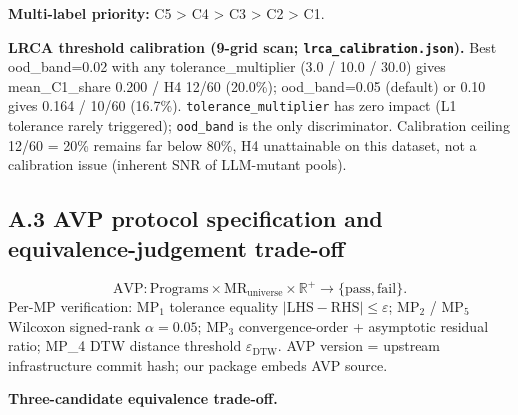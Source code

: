 \documentclass[manuscript,screen,review]{acmart}
\begin{document}
\textbf{Multi-label priority:} C5 \textgreater{} C4 \textgreater{} C3
\textgreater{} C2 \textgreater{} C1.

\textbf{LRCA threshold calibration (9-grid scan;
\texttt{lrca\_calibration.json}).} Best ood\_band=0.02 with any
tolerance\_multiplier (3.0 / 10.0 / 30.0) gives mean\_C1\_share 0.200 /
H4 12/60 (20.0\%); ood\_band=0.05 (default) or 0.10 gives 0.164 / 10/60
(16.7\%). \texttt{tolerance\_multiplier} has zero impact (L1 tolerance
rarely triggered); \texttt{ood\_band} is the only discriminator.
Calibration ceiling 12/60 = 20\% remains far below 80\%, H4
unattainable on this dataset, not a calibration issue (inherent SNR of
LLM-mutant pools).

\subsection{A.3 AVP protocol specification and equivalence-judgement trade-off}\label{a.3-avp-protocol-specification-and-equivalence-judgement-trade-off}

\[
\mathrm{AVP}: \mathrm{Programs} \times \mathrm{MR}_{\mathrm{universe}} \times \mathbb{R}^{+} \to \{\mathrm{pass}, \mathrm{fail}\}.
\]
Per-MP verification: $\mathrm{MP}_1$ tolerance equality $|\mathrm{LHS} -
\mathrm{RHS}| \leq \varepsilon$; $\mathrm{MP}_2$ / $\mathrm{MP}_5$ Wilcoxon signed-rank $\alpha=0.05$; $\mathrm{MP}_3$
convergence-order + asymptotic residual ratio; MP\_4 DTW distance
threshold $\varepsilon_{\mathrm{DTW}}$. AVP version = upstream infrastructure commit hash; our package embeds
AVP source.

\textbf{Three-candidate equivalence trade-off.}
\end{document}
